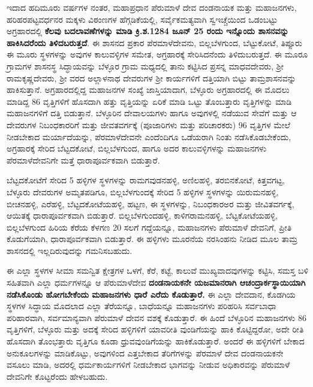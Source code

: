 ಇದಾದ ಹದಿಮೂರು ವರ್ಷಗಳ ನಂತರ, ಮಹಾಪ್ರಧಾನ ಪೆರುಮಾಳೆ ದೇವ ದಂಡನಾಯಕ ಮತ್ತು ಮಹಾಜನಗಳು, ಹರಿಹರಪಟ್ಟವರ್ಧನರ ಮಕ್ಕಳು ವಿಠಂಣಗಳ ಹೆಗ್ಗಡಿಕೆಯಲ್ಲಿ, ಸರ್ವೈಕಮತ್ಯವಾಗಿ ಸ್ವಇಚ್ಚೆಯಿಂದ ಒಡಂಬಟ್ಟು ಅಗ್ರಹಾರದಲ್ಲಿ \textbf{ಕೆಲವು ಬದಲಾವಣೆಗಳನ್ನು ಮಾಡಿ ಕ್ರಿ.ಶ.1284 ಜೂನ್​ 25 ರಂದು ಇನ್ನೊಂದು ಶಾಸನವನ್ನು ಹಾಕಿಸಿದರೆಂದು ತಿಳಿದಬರುತ್ತದೆ}. ಈ ಶಾಸನದ ಪ್ರಕಾರ ಪೆರಮಾಳೆದೇವನು, ಬಿಲ್ಲಬೆಳಗುಂದ, ಬೆಟ್ಟುಕೋಟೆ, ತಿಪ್ಪೂರು ಈ ಮೂರು ಸ್ಥಳಗಳನ್ನು ಅವುಗಳ ಕಾಲುವಳ್ಳಿಗಳ ಸಮೇತ, ಅಗ್ರಹಾರಕ್ಕೆ ಸೇರಿಸಿದನೆಂದು ತಿಳಿದುಬರುತ್ತದೆ. ಈ ಮೂರೂ ಗ್ರಾಮಗಳ ಶಾಸನಸ್ಥ ಸಿದ್ಧಾಯವನ್ನು ಬೆಳ್ಳೂರ ಗ್ರಾಮ ಮಧ್ಯದಲ್ಲಿ ತಾನು ಕಟ್ಟಿಸಿದ ಪ್ರಸನ್ನ ಮಾಧವದೇವರು, ಶ‍್ರೀ ರಾಮಕೃಷ್ಣದೇವರು, ಶ‍್ರೀ ವರದ ಅಲ್ಲಾಳನಾಥ ದೇವರುಗಳ ಶ‍್ರೀ ಕಾರ್ಯಗಳಿಗೆ ದತ್ತಿಯಾಗಿ ಬಿಟ್ಟು ತಾಮ್ರಶಾಸನವನ್ನು ಹಾಕಿಸುತ್ತಾನೆ. ಅಗ್ರಹಾರದಲ್ಲಿದ್ದ ಮಹಾಜನಗಳ ಸಂಖ್ಯೆ ಜಾಸ್ತಿಯಾದಾಗ, ಬೆಳ್ಳೂರು ಅಗ್ರಹಾರದಲ್ಲಿ ಈ ಮೊದಲು ಮಾಡಿದ್ದ 86 ವೃತ್ತಿಗಳಿಗೆ ಹೊಸದಾಗಿ ಹತ್ತು ವೃತ್ತಿಯನ್ನು ಏರಿಕೆ ಮಾಡಿ ಒಟ್ಟು ತೊಂಬತ್ತಾರು ವೃತ್ತಿಗಳನ್ನು ಮಾಡಿ ಮಹಾಜನಗಳಿಗೆ ದತ್ತಿ ಬಿಡುತ್ತಾನೆ. ಬೆಳ್ಳೂರಿನ ದೇವಾಲಯಗಳು ಹಾಗೂ ಅವುಗಳಲ್ಲಿ ನಡೆಯುವ ಸೇವೆಗೆ ಮತ್ತು ಆ ದೇವರುಗಳ ನಿಬಂಧಕಾರರಿಗೆ ಮತ್ತು ಜೀವತವರ್ಗಕ್ಕೆ (ಪೂಜಾರಿಗಳು ಮತ್ತು ಪರಿಚಾರಕರು) 96 ವೃತ್ತಿಗಳ ಮೇಲೆ ನೀಡಬೇಕಾದ ಮರ್ಯಾದೆಯನ್ನು, ಪೆರಮಾಳೆದೇವನೇ ಎಂದೆಂದಿಗೂ ಒಡೆಯರಾಗಿ ನಿಂತು ನಡೆಸಿಕೊಡಬೇಕೆಂದು, ಅಗ್ರಹಾರಕ್ಕೆ ಸೇರಿದ ಬೆಟ್ಟದಕೋಟೆ, ಬಿಲ್ಲಬೆಳಗುಂದ, ಹಾಗೂ ಅದರ ಕಾಲುವಳ್ಳಿಗಳನ್ನು ಮಹಾಜನಗಳು ಪೆರಮಾಳೆದೇವನಿಗೇ ಮತ್ತೆ ಧಾರಾಪೂರ್ವಕವಾಗಿ ಬಿಡುತ್ತಾರೆ.

ಬೆಟ್ಟದಕೋಟೆಗೆ ಸೇರಿದ 5 ಹಳ್ಳಿಗಳ ಸ್ಥಳಗಳನ್ನು ರಾಮಗವುಡನಹಳ್ಳಿ, ಅಣಿಲಹಳ್ಳಿ, ತರಬಿನಕೋಟೆ, ಕಿತ್ತವಗಟ್ಟ, ಬೆಳ್ಳೂರು ದೇವರುಗಳ ಅಮೃತಪಡಿಗೂ, ಬಿಲ್ಲಬೆಳಗುಂದಕ್ಕೆ ಸೇರಿದ 5 ಹಳ್ಳಿಗಳ ಸ್ಥಳಗಳನ್ನು ಯಿರುಮನಹಳ್ಳಿ, ಬೀಚನಹಳ್ಳಿ, ಎರೆಹಳ್ಳಿ, ಬೆಟ್ಟದಕೋಟೆಯಹಳ್ಳಿ, ಹಟ್ಟಣ, ಈ ಸ್ಥಳಗಳನ್ನು, ನಿಬಂಧಕಾರಅರ ಮತ್ತು ಜೀವಿತವರ್ಗಕ್ಕೆ, ಆಯಿತಕ್ಕೆ ಧಾರಾಪೂರ್ವಕವಾಗಿ ಬಿಡುತ್ತಾರೆ. ಬಿಲ್ಲಬೆಳಗುಂದಹಳ್ಳಿ, ಕಾಳಿಗರಾಮನಹಳ್ಳಿ, ಬೆಟ್ಟಕೋಟೆಯಹಳ್ಳಿ, ಬಿಲ್ಲಬೆಳಗುಂದ ಹಿರಿಯ ಕೆರೆಯ ಕೆಳಗಣ 20 ಸಲಗೆ ಗದ್ದೆಯನ್ನೂ, ಮಹಾಜನಗಳು ಪೆರುಮಾಳೆ ದೇವನಿಗೆ, ಪ್ರೀತಿ ಕೊಡುಗೆಯಾಗಿ, ಧಾರಾಪೂರ್ವಕವಾಗಿ ಬಿಡುತ್ತಾರೆ. ಈ ಹಳ್ಳಿಗಳು ಮೂರನೆಯ ನರಸಿಂಹನು ನೀಡಿದ ಮೂಲ ತಾಮ್ರ ಶಾಸನದಲ್ಲಿ ಇಲ್ಲದಿರುವುದನ್ನು ಗಮನಿಸಬಹುದು.

ಈ ಎಲ್ಲಾ ಸ್ಥಳಗಳ ಸೀಮಾ ಸಮನ್ವಿತ ಕ್ಷೇತ್ರಗಳ ಒಳಗೆ, ಕೆರೆ, ಕಟ್ಟೆ, ಕಾಲುವೆ ಮುಖ್ಯವಾದವುಗಳನ್ನು ಕಟ್ಟಿಸಿ, ಸಮಸ್ತ ಬಳಿ ಸಹಿತವಾಗಿ ಎಲ್ಲಾ ಧರ್ಮಗಳನ್ನೂ ಆ ಪೆರುಮಾಳೆದೇವ \textbf{ದಂಡನಾಯಕನೇ ಯಜಮಾನರಾಗಿ ಆಚಂದ್ರಾರ್ಕಸ್ಥಾಯಿಯಾಗಿ ನಡೆಸಿಕೊಂಡು ಹೋಗಬೇಕೆಂದು ಮಹಾಜನಗಳು ಧಾರೆ ಎರೆದು ಕೊಡುತ್ತಾರೆ.} ಈ ಎಲ್ಲಾ ದೇವದಾನ, ಕೊಡಗಿಯ ಸ್ಥಳಗಳ ಸಿದ್ಧಾಯ ಮೊದಲಾದ ಎಲ್ಲಾ ತೆರೆಯನ್ನೂ, ಬಾಧೆಯನ್ನೂ ಮಹಾಜನಗಳು ಪರಿಹರಿಸಿ ಸರ್ವಬಾಧಾ ಪರಿಹಾರವಾಗಿ, ಸರ್ವಮಾನ್ಯವಾಗಿ ಪೆರುಮಾಳೆ ದೇವನ ವಶಕ್ಕೆ ಕೊಡುತ್ತಾರೆ. ಈ ಹಿಂದೆ ಬೆಳ್ಳೂರಿನ ಮಹಾಜನಗಳು 86 ವೃತ್ತಿಗಳಿಗೆ, ಬೆಳ್ಳೂರು ಮತ್ತು ಅದಕ್ಕೆ ಸೇರಿದ ಹಳ್ಳಿಗಳಿಗೆ ಯಾವರೀತಿ ವುಂಡಿಗೆಯನ್ನು ಹಾಕಿ ಕೊಟ್ಟಿದ್ದರೋ, ಅದೇ ರೀತಿ ಹೊಸದಾಗಿ ತೊಂಭತ್ತಾರು ವೃತ್ತಿಗೂ ಕೂಡಾ ಧ್ರುವವುಂಡಿಗೆಯನ್ನು ಹಾಕಿಕೊಡುತ್ತಾರೆ. ಅಂದರೆ ಈ ಹಳ್ಳಿಗಳಿಗೆ ಬೇಕಾದ ಅನುಕೂಲಗಳನ್ನು ಮಾಡಿಕೊಟ್ಟು, ಅವುಗಳಿಂದ ಎತ್ತಬೇಕಾದ ತೆರಿಗೆಗಳನ್ನು ಪೆರಮಾಳೆ ದೇವ ದಂಡನಾಯಕನೇ ವಸೂಲು ಮಾಡಿ, ಅದರಲ್ಲಿ ಧರ್ಮಕಾರ್ಯಗಳಿಗೆ ನೀಡಬೇಕಾದ ಭಾಗವನ್ನು ನೀಡುವ ಅಧಿಕಾರವನ್ನು ಪೆರುಮಾಳೆ ದೇವನಿಗೇ ಕೊಟ್ಟರೆಂದು ಹೇಳಬಹುದು.


